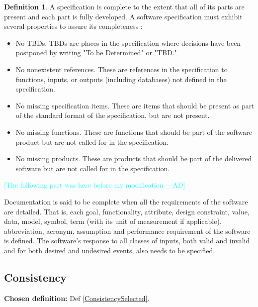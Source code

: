 \documentclass[letterpaper,cleveref]{lipics-v2019}
\newcommand{\authornote}[3]{\textcolor{#1}{[#3 ---#2]}}
\newcommand{\authornote}[3]{}
\newcommand{\ad}[1]{\authornote{cyan}{AD}{#1}} %
\theoremstyle{definition}
\newtheorem{defn}{Definition}
\begin{document}
\begin{defn}
\label{CompletenessSelected}
A specification is complete to the extent that all of its parts are present and
each part is fully developed. A software specification must exhibit several
properties to assure its completeness \citep{Boehm1984}:
\begin{itemize}
\item No TBDs. TBDs are places in the specification where decisions have been
postponed by writing "To be Determined" or "TBD."
\item No nonexistent references. These are references in the specification to
functions, inputs, or outputs (including databases) not defined in the
specification.
\item No missing specification items. These are items that should be present as
part of the standard format of the specification, but are not present.
\item No missing functions. These are functions that should be part of the
software product but are not called for in the specification.
\item No missing products. These are products that should be part of the
delivered software but are not called for in the specification.
\end{itemize}
\end{defn}

\ad{The following part was here before my modification}

Documentation is said to be complete when all the requirements of the software
are detailed. That is, each goal, functionality, attribute, design constraint,
value, data, model, symbol, term (with its unit of measurement if applicable),
abbreviation, acronym, assumption and performance requirement of the software is
defined. The software's response to all classes of inputs, both valid and
invalid and for both desired and undesired events, also needs to be specified.

\subsection{Consistency}
\noindent \textbf{Chosen definition:} Def \ref{ConsistencySelected}.
\end{document}
